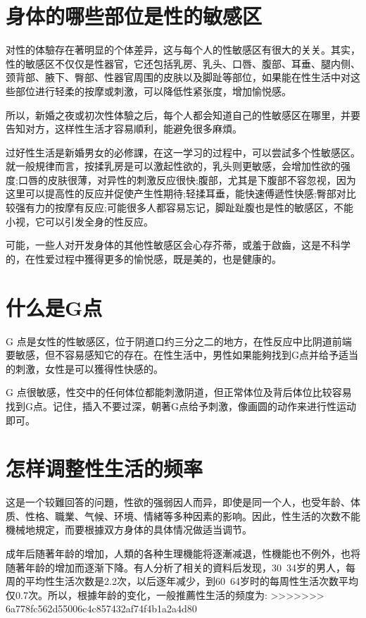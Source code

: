\documentclass[12pt,UTF8]{ctexbook}
\begin{document}
\section{身体的哪些部位是性的敏感区}

对性的体驗存在著明显的个体差异，这与每个人的性敏感区有很大的关关。其实，性的敏感区不仅仅是性器官，它还包括乳房、乳头、口唇、腹部、耳垂、腿内侧、颈背部、腋下、臀部、性器官周围的皮肤以及脚趾等部位，如果能在性生活中对这些部位进行轻柔的按摩或刺激，可以降低性紧张度，增加愉悦感。

所以，新婚之夜或初次性体驗之后，每个人都会知道自己的性敏感区在哪里，并要告知对方，这样性生活才容易順利，能避免很多麻煩。

过好性生活是新婚男女的必修課，在这一学习的过程中，可以尝試多个性敏感区。就一般規律而言，按揉乳房是可以激起性欲的，乳头则更敏感，会增加性欲的强度;口唇的皮肤很薄，对异性的刺激反应很快;腹部，尤其是下腹部不容忽视，因为这里可以提高性的反应并促使产生性期待;轻揉耳垂，能快速傅遞性快感;臀部对比较强有力的按摩有反应;可能很多人都容易忘记，脚趾趾腹也是性的敏感区，不能小视，它可以引发全身的性反应。

可能，一些人对开发身体的其他性敏感区会心存芥蒂，或羞于啟齒，这是不科学的，在性爱过程中獲得更多的愉悦感，既是美的，也是健康的。

\section{什么是G点}

G 点是女性的性敏感区，位于阴道口约三分之二的地方，在性反应中比阴道前端要敏感，但不容易感知它的存在。在性生活中，男性如果能夠找到G点并给予适当的刺激，女性是可以獲得性快感的。

G 点很敏感，性交中的任何体位都能刺激阴道，但正常体位及背后体位比较容易找到G点。记住，插入不要过深，朝著G点给予刺激，像画圆的动作来进行性运动即可。

\section{怎样调整性生活的频率}

这是一个较難回答的问題，性欲的强弱因人而异，即使是同一个人，也受年龄、体质、性格、職業、气候、环境、情緒等多种因素的影响。因此，性生活的次数不能機械地規定，而要根據双方身体的具体情况做适当调节。

成年后随著年龄的增加，人類的各种生理機能将逐漸减退，性機能也不例外，也将随著年龄的增加而逐渐下降。有人分析了相关的資料后发现，30~34岁的男人，每周的平均性生活次数是2.2次，以后逐年减少，到60~64岁时的每周性生活次数平均仅0.7次。所以，根據年龄的变化，一般推薦性生活的频度为:
>>>>>>> 6a778fc562d55006c4c857432af74f4b1a2a4d80
\end{document}
